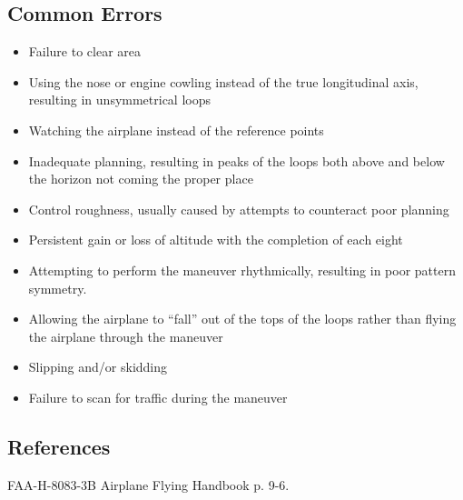 \subsection{Common Errors}

\begin{itemize}

  \item Failure to clear area
  \item Using the nose or engine cowling instead of the true longitudinal axis,
    resulting in unsymmetrical loops
  \item Watching the airplane instead of the reference points
  \item Inadequate planning, resulting in peaks of the loops both above and
    below the horizon not coming the proper place
  \item Control roughness, usually caused by attempts to counteract poor
    planning
  \item Persistent gain or loss of altitude with the completion of each eight
  \item Attempting to perform the maneuver rhythmically, resulting in poor
    pattern symmetry.
  \item Allowing the airplane to ``fall'' out of the tops of the loops rather
    than flying the airplane through the maneuver
  \item Slipping and/or skidding
  \item Failure to scan for traffic during the maneuver

\end{itemize}

\subsection{References}

FAA-H-8083-3B Airplane Flying Handbook p. 9-6.

